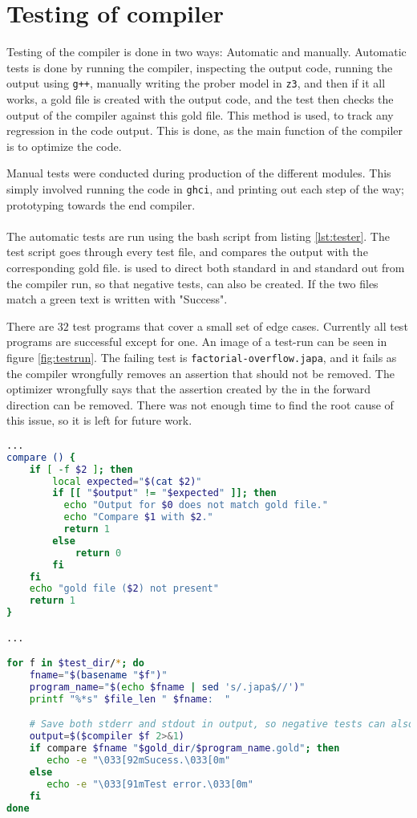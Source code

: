 \section{Testing of compiler \rr} \label{sec:tests}
Testing of the compiler is done in two ways: Automatic and manually. Automatic tests is
done by running the compiler, inspecting the output code, running the output using \texttt{g++},
manually writing the prober model in \texttt{z3}, and then if it all works, a gold file is
created with the output code, and the test then checks the output of the compiler against this
gold file. This method is used, to track any regression in the code output. This is done, as
the main function of the compiler is to optimize the code.

Manual tests were conducted during production of the different modules. This simply involved
running the code in \texttt{ghci}, and printing out each step of the way; prototyping towards
the end compiler.
\\
\\
The automatic tests are run using the bash script from listing \ref{lst:tester}. The test
script goes through every test \lan file, and compares the output with the corresponding
gold file.  is used to direct both standard in and standard out from the compiler
run, so that negative tests, can also be created. If the two files match a green text
is written with "Success".

There are $32$ test programs that cover a small set of edge cases. Currently all test programs
are successful except for one. An image of a test-run can be seen in figure \ref{fig:testrun}.
The failing test is \texttt{factorial-overflow.japa}, and it fails as the compiler wrongfully
removes an assertion that should not be removed. The optimizer wrongfully says that the assertion
created by the  in the forward direction can be removed. There was not enough time
to find the root cause of this issue, so it is left for future work.


\begin{lstlisting}[language=Bash, label={lst:tester}]
...
compare () {
    if [ -f $2 ]; then
        local expected="$(cat $2)"
        if [[ "$output" != "$expected" ]]; then
          echo "Output for $0 does not match gold file."
          echo "Compare $1 with $2."
          return 1
        else
            return 0
        fi
    fi
    echo "gold file ($2) not present"
    return 1
}

...

for f in $test_dir/*; do
    fname="$(basename "$f")"
    program_name="$(echo $fname | sed 's/.japa$//')"
    printf "%*s" $file_len " $fname:  "

    # Save both stderr and stdout in output, so negative tests can also be tested
    output=$($compiler $f 2>&1)
    if compare $fname "$gold_dir/$program_name.gold"; then
       echo -e "\033[92mSucess.\033[0m"
    else
       echo -e "\033[91mTest error.\033[0m"
    fi
done
\end{lstlisting}